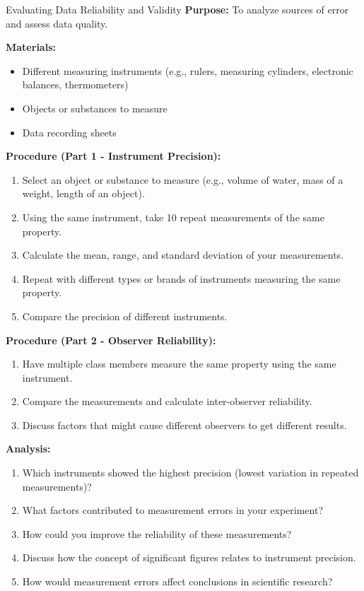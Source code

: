 \begin{investigation}{Evaluating Data Reliability and Validity}
\textbf{Purpose:} To analyze sources of error and assess data quality.

\textbf{Materials:}
\begin{itemize}
    \item Different measuring instruments (e.g., rulers, measuring cylinders, electronic balances, thermometers)
    \item Objects or substances to measure
    \item Data recording sheets
\end{itemize}

\textbf{Procedure (Part 1 - Instrument Precision):}
\begin{enumerate}
    \item Select an object or substance to measure (e.g., volume of water, mass of a weight, length of an object).
    \item Using the same instrument, take 10 repeat measurements of the same property.
    \item Calculate the mean, range, and standard deviation of your measurements.
    \item Repeat with different types or brands of instruments measuring the same property.
    \item Compare the precision of different instruments.
\end{enumerate}

\textbf{Procedure (Part 2 - Observer Reliability):}
\begin{enumerate}
    \item Have multiple class members measure the same property using the same instrument.
    \item Compare the measurements and calculate inter-observer reliability.
    \item Discuss factors that might cause different observers to get different results.
\end{enumerate}

\textbf{Analysis:}
\begin{enumerate}
    \item Which instruments showed the highest precision (lowest variation in repeated measurements)?
    \item What factors contributed to measurement errors in your experiment?
    \item How could you improve the reliability of these measurements?
    \item Discuss how the concept of significant figures relates to instrument precision.
    \item How would measurement errors affect conclusions in scientific research?
\end{enumerate}
\end{investigation}

